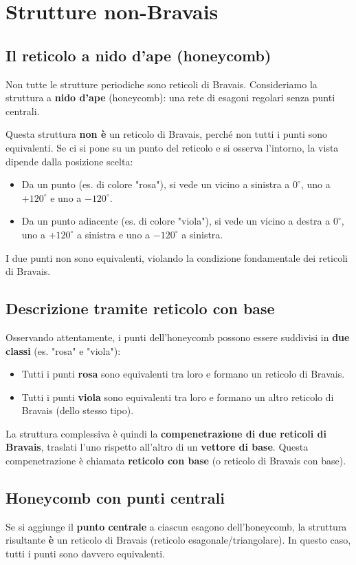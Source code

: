 \section{Strutture non-Bravais}

\subsection*{Il reticolo a nido d'ape (honeycomb)}
Non tutte le strutture periodiche sono reticoli di Bravais. Consideriamo la struttura a \textbf{nido d'ape} (honeycomb): una rete di esagoni regolari senza punti centrali.

Questa struttura \textbf{non è} un reticolo di Bravais, perché non tutti i punti sono equivalenti. Se ci si pone su un punto del reticolo e si osserva l'intorno, la vista dipende dalla posizione scelta:
\begin{itemize}
    \item Da un punto (es. di colore "rosa"), si vede un vicino a sinistra a $0^\circ$, uno a $+120^\circ$ e uno a $-120^\circ$.
    \item Da un punto adiacente (es. di colore "viola"), si vede un vicino a destra a $0^\circ$, uno a $+120^\circ$ a sinistra e uno a $-120^\circ$ a sinistra.
\end{itemize}
I due punti non sono equivalenti, violando la condizione fondamentale dei reticoli di Bravais.

\subsection*{Descrizione tramite reticolo con base}
Osservando attentamente, i punti dell'honeycomb possono essere suddivisi in \textbf{due classi} (es. "rosa" e "viola"):
\begin{itemize}
    \item Tutti i punti \textbf{rosa} sono equivalenti tra loro e formano un reticolo di Bravais.
    \item Tutti i punti \textbf{viola} sono equivalenti tra loro e formano un altro reticolo di Bravais (dello stesso tipo).
\end{itemize}
La struttura complessiva è quindi la \textbf{compenetrazione di due reticoli di Bravais}, traslati l'uno rispetto all'altro di un \textbf{vettore di base}. Questa compenetrazione è chiamata \textbf{reticolo con base} (o reticolo di Bravais con base).

\subsection*{Honeycomb con punti centrali}
Se si aggiunge il \textbf{punto centrale} a ciascun esagono dell'honeycomb, la struttura risultante \textbf{è} un reticolo di Bravais (reticolo esagonale/triangolare). In questo caso, tutti i punti sono davvero equivalenti.

